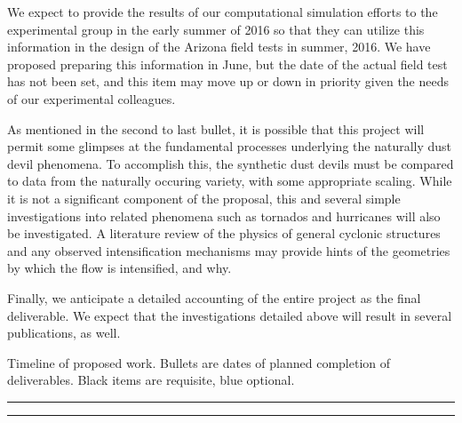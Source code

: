 We expect to provide the results of our computational
simulation efforts to the experimental group in the early summer of 2016
so that they can utilize this information in the design of the
Arizona field tests in summer, 2016. We have proposed preparing this
information in June, but the date of the actual field test has not been
set, and this item may move up or down in priority given the needs of
our experimental colleagues. 

As mentioned in the second to last bullet, it is possible that this
project will permit some glimpses  
at the fundamental processes underlying the naturally dust devil
phenomena. To accomplish this, the synthetic dust devils must be
compared to data from the naturally occuring variety,  with some
appropriate scaling. While it is not a significant component of the
proposal, this and several simple investigations into related phenomena
such as tornados and hurricanes will also  be investigated. A literature
review of the physics of general cyclonic structures and any observed
intensification mechanisms may provide hints of the geometries 
by which the flow is intensified, and why. 

Finally, we anticipate a detailed accounting of the entire project as
the final deliverable. We expect that the investigations detailed
above will result in several publications, as well. 
%
%


\begin{center}
\begin{table}
\caption{Timeline of proposed work. Bullets are dates of planned
 completion of deliverables. Black items are requisite, blue optional.}
\centering
\begin{minipage}[t]{.7\linewidth}
\color{black}
\rule{\linewidth}{1pt}
\bigskip
\rule{\linewidth}{1pt}%
\end{minipage}%
\end{table}
\label{tab:prop}
\end{center}

